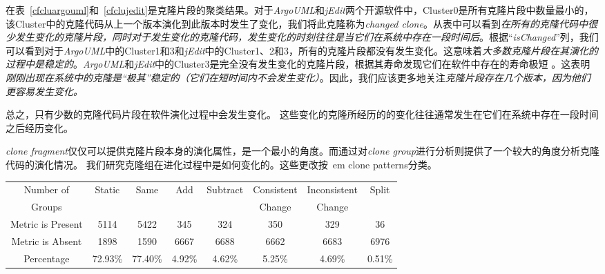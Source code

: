 在表~\ref{cfcluargouml}和~\ref{cfclujedit}是克隆片段的聚类结果。对于{\em ArgoUML}和{\em jEdit}两个开源软件中，Cluster0是所有克隆片段中数量最小的，该Cluster中的克隆代码从上一个版本演化到此版本时发生了变化，我们将此克隆称为{\em changed clone}。从表中可以看到{\em 在所有的克隆代码中很少发生变化的克隆片段，同时对于发生变化的克隆代码，发生变化的时刻往往是当它们在系统中存在一段时间后}。根据``{\em isChanged}''列，我们可以看到对于{\em  ArgoUML}中的Cluster1和3和{\em  jEdit}中的Cluster1、2和3，所有的克隆片段都没有发生变化。这意味着{\em 大多数克隆片段在其演化的过程中是稳定的}。{\em ArgoUML}和{\em jEdit}中的Cluster3是完全没有发生变化的克隆片段，根据其寿命发现它们在软件中存在的寿命极短 。这表明{\em 刚刚出现在系统中的克隆是“极其”稳定的（它们在短时间内不会发生变化）}。因此，我们应该更多地关注{\em 克隆片段存在几个版本，因为他们更容易发生变化。}

总之，只有少数的克隆代码片段在软件演化过程中会发生变化。 这些变化的克隆所经历的的变化往往通常发生在它们在系统中存在一段时间之后经历变化。


{\em clone fragment}仅仅可以提供克隆片段本身的演化属性，是一个最小的角度。而通过对{\em clone group}进行分析则提供了一个较大的角度分析克隆代码的演化情况。 %
我们研究克隆组在进化过程中是如何变化的。这些更改按{\ em clone patterns}分类。

\begin{table}[htbp]
\vspace{0.5em}
\centering\wuhao
\begin{tabular}{cccccccc}
\toprule[1.5pt]
Number of&\multirow{2}{*}{Static}&\multirow{2}{*}{Same}&\multirow{2}{*}{Add}&\multirow{2}{*}{Subtract}&Consistent&Inconsistent&\multirow{2}{*}{Split}\\ 
Groups&&&&&Change&Change&\\ 
\midrule[1pt]
Metric is Present	&5114	&5422	&345	&324	&350	&329	&36\\ 
Metric is Absent	&1898	&1590	&6667	&6688	&6662	&6683	&6976\\ 
Percentage	&72.93\%	&77.40\%	&4.92\%	&4.62\%	&5.25\%	&4.69\%	&0.51\%\\ 
\bottomrule[1.5pt]
\end{tabular}
\end{table}

